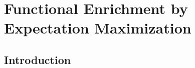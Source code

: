 
\chapter{Functional Enrichment by Expectation Maximization}




\section{Introduction}
\label{sec:org28fe636}



